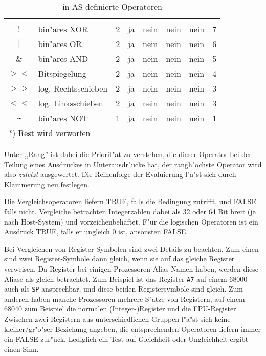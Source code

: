 \documentclass[12pt,a4paper,twoside]{report}
\newcommand{\ii}[1]{{\it #1}}
\begin{document}
\begin{table*}[htbp]
\begin{center}
\begin{tabular}{|c|l|c|c|c|c|c|c|}
            & & & & & &  \\
$!$         & bin"ares XOR         & 2 & ja   & nein & nein & nein & 7 \\
$|$         & bin"ares OR          & 2 & ja   & nein & nein & nein & 6 \\
\&          & bin"ares AND         & 2 & ja   & nein & nein & nein & 5 \\
$><$        & Bitspiegelung        & 2 & ja   & nein & nein & nein & 4 \\
$>>$        & log. Rechtsschieben  & 2 & ja   & nein & nein & nein & 3 \\
$<<$        & log. Linksschieben   & 2 & ja   & nein & nein & nein & 3 \\
\verb! ~ !  & bin"ares NOT         & 1 & ja   & nein & nein & nein & 1 \\
\hline
\multicolumn{8}{|l|}{*) Rest wird verworfen} \\
\hline
\end{tabular}\end{center}
\caption{in AS definierte Operatoren\label{TabOps}}
\end{table*}
Unter ,,Rang'' ist dabei die Priorit"at zu verstehen, die dieser Operator bei
der Teilung eines Ausdruckes in Unterausdr"ucke hat, der rangh"ochste
Operator wird also \ii{zuletzt} ausgewertet.  Die Reihenfolge der
Evaluierung l"a"st sich durch Klammerung neu festlegen.
\par
Die Vergleichsoperatoren liefern TRUE, falls die Bedingung zutrifft,
und FALSE falls nicht.  Vergleiche betrachten Integerzahlen dabei als
32 oder 64 Bit breit (je nach Host-System) und vorzeichenbehaftet. F"ur
die logischen Operatoren ist ein Ausdruck TRUE, falls er ungleich 0 ist,
ansonsten FALSE.
\par
Bei Vergleichen von Register-Symbolen sind zwei Details zu beachten.
Zum einen sind zwei Register-Symbole dann gleich, wenn sie auf das
gleiche Register verweisen.  Da Register bei einigen Prozessoren
Alias-Namen haben, werden diese Aliase als gleich betrachtet.  Zum
Beispiel ist das Register {\tt A7} auf einem 68000 auch als {\tt SP}
ansprechbar, und diese beiden Registersymbole sind gleich.  Zum anderen
haben manche Prozessoren mehrere S"atze von Registern, auf einem 68040
zum Beispiel die normalen (Integer-)Register und die FPU-Register.
Zwischen zwei Registern aus unterschiedlichen Gruppen l"a"st sich
keine kleiner/gr"o"ser-Beziehung angeben, die entsprechenden Operatoren
liefern immer ein FALSE zur"uck.  Lediglich ein Test auf Gleichheit oder
Ungleichheit ergibt einen Sinn.
\end{document}
